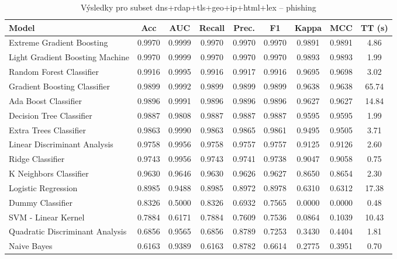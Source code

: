 \begin{table}[H]
  \centering
  \small
  \caption{Výsledky pro subset dns+rdap+tls+geo+ip+html+lex – phishing}
  \begin{tabular}{|l|c|c|c|c|c|c|c|c|}
    \hline
    \textbf{Model} & \textbf{Acc} & \textbf{AUC} & \textbf{Recall} & \textbf{Prec.} & \textbf{F1} & \textbf{Kappa} & \textbf{MCC} & \textbf{TT (s)} \\
    \hline
    Extreme Gradient Boosting & 0.9970 & 0.9999 & 0.9970 & 0.9970 & 0.9970 & 0.9891 & 0.9891 & 4.86 \\
    Light Gradient Boosting Machine & 0.9970 & 0.9999 & 0.9970 & 0.9970 & 0.9970 & 0.9893 & 0.9893 & 1.99 \\
    Random Forest Classifier & 0.9916 & 0.9995 & 0.9916 & 0.9917 & 0.9916 & 0.9695 & 0.9698 & 3.02 \\
    Gradient Boosting Classifier & 0.9899 & 0.9992 & 0.9899 & 0.9899 & 0.9899 & 0.9638 & 0.9638 & 65.74 \\
    Ada Boost Classifier & 0.9896 & 0.9991 & 0.9896 & 0.9896 & 0.9896 & 0.9627 & 0.9627 & 14.84 \\
    Decision Tree Classifier & 0.9887 & 0.9808 & 0.9887 & 0.9887 & 0.9887 & 0.9595 & 0.9595 & 1.99 \\
    Extra Trees Classifier & 0.9863 & 0.9990 & 0.9863 & 0.9865 & 0.9861 & 0.9495 & 0.9505 & 3.71 \\
    Linear Discriminant Analysis & 0.9758 & 0.9956 & 0.9758 & 0.9757 & 0.9757 & 0.9125 & 0.9126 & 2.60 \\
    Ridge Classifier & 0.9743 & 0.9956 & 0.9743 & 0.9741 & 0.9738 & 0.9047 & 0.9058 & 0.75 \\
    K Neighbors Classifier & 0.9630 & 0.9646 & 0.9630 & 0.9626 & 0.9627 & 0.8650 & 0.8654 & 2.30 \\
    Logistic Regression & 0.8985 & 0.9488 & 0.8985 & 0.8972 & 0.8978 & 0.6310 & 0.6312 & 17.38 \\
    Dummy Classifier & 0.8326 & 0.5000 & 0.8326 & 0.6932 & 0.7565 & 0.0000 & 0.0000 & 0.48 \\
    SVM - Linear Kernel & 0.7884 & 0.6171 & 0.7884 & 0.7609 & 0.7536 & 0.0864 & 0.1039 & 10.43 \\
    Quadratic Discriminant Analysis & 0.6856 & 0.9565 & 0.6856 & 0.8789 & 0.7253 & 0.3430 & 0.4404 & 1.81 \\
    Naive Bayes & 0.6163 & 0.9389 & 0.6163 & 0.8782 & 0.6614 & 0.2775 & 0.3951 & 0.70 \\
    \hline
  \end{tabular}
\end{table}
\vspace{0.5cm}


